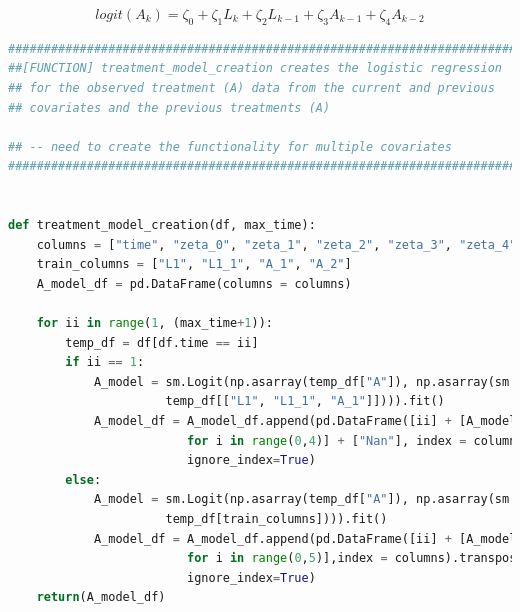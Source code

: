 \[ logit(A_k) = \zeta_0 + \zeta_1 L_{k} + \zeta_2 L_{k-1} + \zeta_3 A_{k-1} + \zeta_4 A_{k-2} \]

\begin{lstlisting}[language=Python]
#########################################################################
##[FUNCTION] treatment_model_creation creates the logistic regression 
## for the observed treatment (A) data from the current and previous 
## covariates and the previous treatments (A) 

## -- need to create the functionality for multiple covariates
#########################################################################


def treatment_model_creation(df, max_time): 
    columns = ["time", "zeta_0", "zeta_1", "zeta_2", "zeta_3", "zeta_4"]
    train_columns = ["L1", "L1_1", "A_1", "A_2"]
    A_model_df = pd.DataFrame(columns = columns)

    for ii in range(1, (max_time+1)): 
        temp_df = df[df.time == ii]   
        if ii == 1: 
            A_model = sm.Logit(np.asarray(temp_df["A"]), np.asarray(sm.add_constant(\
                      temp_df[["L1", "L1_1", "A_1"]]))).fit()
            A_model_df = A_model_df.append(pd.DataFrame([ii] + [A_model.params[i] \
                         for i in range(0,4)] + ["Nan"], index = columns).transpose(),\
                         ignore_index=True)
        else: 
            A_model = sm.Logit(np.asarray(temp_df["A"]), np.asarray(sm.add_constant(\
                      temp_df[train_columns]))).fit()
            A_model_df = A_model_df.append(pd.DataFrame([ii] + [A_model.params[i] \
                         for i in range(0,5)],index = columns).transpose(), \
                         ignore_index=True)
    return(A_model_df)
\end{lstlisting}

